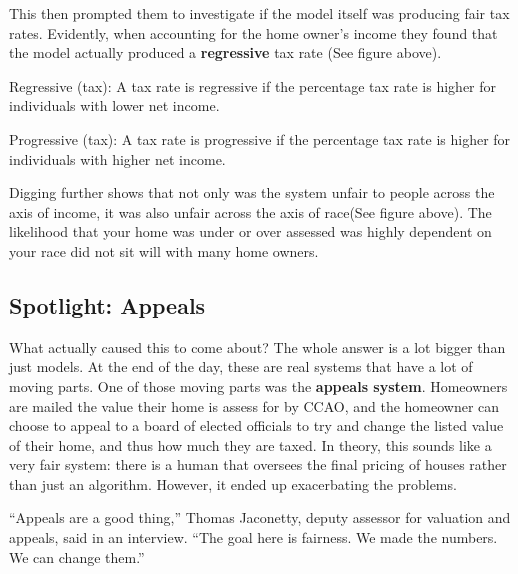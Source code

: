 \documentclass[
  letterpaper,
  DIV=11,
  numbers=noendperiod]{scrreprt}
\begin{document}
This then prompted them to investigate if the model itself was producing
fair tax rates. Evidently, when accounting for the home owner's income
they found that the model actually produced a \textbf{regressive} tax
rate (See figure above).

\begin{tcolorbox}[enhanced jigsaw, breakable, colbacktitle=quarto-callout-color!10!white, colback=white, opacitybacktitle=0.6, opacityback=0, bottomrule=.15mm, titlerule=0mm, toptitle=1mm, bottomtitle=1mm, left=2mm, colframe=quarto-callout-color-frame, title={Definition}, rightrule=.15mm, toprule=.15mm, leftrule=.75mm, arc=.35mm, coltitle=black]

Regressive (tax): A tax rate is regressive if the percentage tax rate is
higher for individuals with lower net income.

Progressive (tax): A tax rate is progressive if the percentage tax rate
is higher for individuals with higher net income.

\end{tcolorbox}

Digging further shows that not only was the system unfair to people
across the axis of income, it was also unfair across the axis of
race(See figure above). The likelihood that your home was under or over
assessed was highly dependent on your race did not sit will with many
home owners.

\hypertarget{spotlight-appeals}{%
\subsection{Spotlight: Appeals}\label{spotlight-appeals}}

What actually caused this to come about? The whole answer is a lot
bigger than just models. At the end of the day, these are real systems
that have a lot of moving parts. One of those moving parts was the
\textbf{appeals system}. Homeowners are mailed the value their home is
assess for by CCAO, and the homeowner can choose to appeal to a board of
elected officials to try and change the listed value of their home, and
thus how much they are taxed. In theory, this sounds like a very fair
system: there is a human that oversees the final pricing of houses
rather than just an algorithm. However, it ended up exacerbating the
problems.

``Appeals are a good thing,'' Thomas Jaconetty, deputy assessor for
valuation and appeals, said in an interview. ``The goal here is
fairness. We made the numbers. We can change them.''
\end{document}
